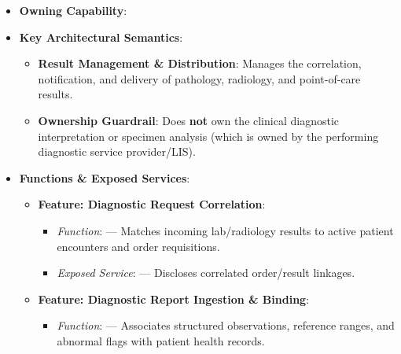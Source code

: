 \begin{itemize}

\item 
\textbf{Owning Capability}: \texttt{}



\item 
\textbf{Key Architectural Semantics}:


\begin{itemize}

\item 
\textbf{Result Management \& Distribution}: Manages the correlation, notification, and delivery of pathology, radiology, and point-of-care results.



\item 
\textbf{Ownership Guardrail}: Does \textbf{not} own the clinical diagnostic interpretation or specimen analysis (which is owned by the performing diagnostic service provider/\allowbreak{}LIS).



\end{itemize}


\item 
\textbf{Functions \& Exposed Services}:


\begin{itemize}

\item 
\textbf{Feature: Diagnostic Request Correlation}:


\begin{itemize}

\item 
\emph{Function}: \texttt{} — Matches incoming lab/\allowbreak{}radiology results to active patient encounters and order requisitions.



\item 
\emph{Exposed Service}: \texttt{} — Discloses correlated order/\allowbreak{}result linkages.



\end{itemize}


\item 
\textbf{Feature: Diagnostic Report Ingestion \& Binding}:


\begin{itemize}

\item 
\emph{Function}: \texttt{} — Associates structured observations, reference ranges, and abnormal flags with patient health records.




\end{itemize}
\end{itemize}
\end{itemize}
